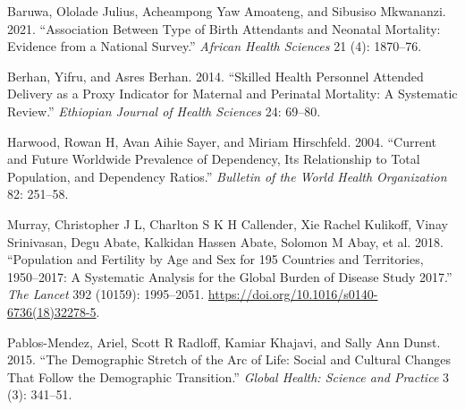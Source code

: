 \documentclass[
  letterpaper,
  DIV=11,
  numbers=noendperiod]{scrartcl}
\newlength{\cslhangindent}
\newenvironment{CSLReferences}[2] %
 {\begin{list}{}{%
  \setlength{\itemindent}{0pt}
  \setlength{\leftmargin}{0pt}
  \setlength{\parsep}{0pt}
  \ifodd #1
   \setlength{\leftmargin}{\cslhangindent}
   \setlength{\itemindent}{-1\cslhangindent}
  \fi
  \setlength{\itemsep}{#2\baselineskip}}}
 {\end{list}}
\begin{document}
\label{refs}
\begin{CSLReferences}{1}{0}
Baruwa, Ololade Julius, Acheampong Yaw Amoateng, and Sibusiso Mkwananzi.
2021. {``Association Between Type of Birth Attendants and Neonatal
Mortality: Evidence from a National Survey.''} \emph{African Health
Sciences} 21 (4): 1870--76.

Berhan, Yifru, and Asres Berhan. 2014. {``Skilled Health Personnel
Attended Delivery as a Proxy Indicator for Maternal and Perinatal
Mortality: A Systematic Review.''} \emph{Ethiopian Journal of Health
Sciences} 24: 69--80.

Harwood, Rowan H, Avan Aihie Sayer, and Miriam Hirschfeld. 2004.
{``Current and Future Worldwide Prevalence of Dependency, Its
Relationship to Total Population, and Dependency Ratios.''}
\emph{Bulletin of the World Health Organization} 82: 251--58.

Murray, Christopher J L, Charlton S K H Callender, Xie Rachel Kulikoff,
Vinay Srinivasan, Degu Abate, Kalkidan Hassen Abate, Solomon M Abay, et
al. 2018. {``Population and Fertility by Age and Sex for 195 Countries
and Territories, 1950--2017: A Systematic Analysis for the Global Burden
of Disease Study 2017.''} \emph{The Lancet} 392 (10159): 1995--2051.
\url{https://doi.org/10.1016/s0140-6736(18)32278-5}.

Pablos-Mendez, Ariel, Scott R Radloff, Kamiar Khajavi, and Sally Ann
Dunst. 2015. {``The Demographic Stretch of the Arc of Life: Social and
Cultural Changes That Follow the Demographic Transition.''} \emph{Global
Health: Science and Practice} 3 (3): 341--51.

\end{CSLReferences}
\end{document}
